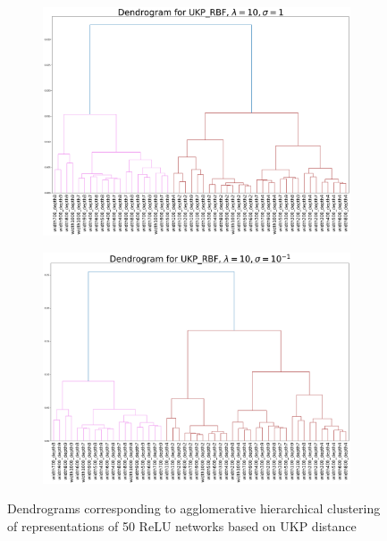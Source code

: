 \documentclass[11pt]{article}
\newcommand{\metricstname}{UKP }
\theoremstyle{plain}
\begin{document}
\begin{figure}[!h]
    \begin{subfigure}[b]{0.45\textwidth}
        \includegraphics[width=\textwidth]{Appendix figures/mnist_experiments/Dendogram/Dendogram for UKP_dist_RBF_1.000000e+01_1.000000e+00.png}
    \end{subfigure}
    \hfill
    \begin{subfigure}[b]{0.45\textwidth}
        \includegraphics[width=\textwidth]{Appendix figures/mnist_experiments/Dendogram/Dendogram for UKP_dist_RBF_1.000000e+01_1.000000e-01.png}
    \end{subfigure}
    
    \caption{Dendrograms corresponding to agglomerative hierarchical clustering of representations of 50 ReLU networks based on \metricstname distance}
    \label{MNIST dendrograms}
\end{figure}
\end{document}
